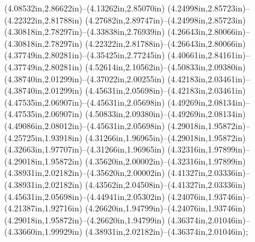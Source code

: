 (4.08532in,2.86622in)--(4.13262in,2.85070in) (4.24998in,2.85723in)--(4.22322in,2.81788in) (4.27682in,2.89747in)--(4.24998in,2.85723in) (4.30818in,2.78297in)--(4.33838in,2.76939in) (4.26643in,2.80066in)--(4.30818in,2.78297in) (4.22322in,2.81788in)--(4.26643in,2.80066in) (4.37749in,2.80281in)--(4.35425in,2.77245in) (4.40661in,2.84161in)--(4.37749in,2.80281in) (4.52614in,2.10562in)--(4.50833in,2.09380in) (4.38740in,2.01299in)--(4.37022in,2.00255in) (4.42183in,2.03461in)--(4.38740in,2.01299in) (4.45631in,2.05698in)--(4.42183in,2.03461in) (4.47535in,2.06907in)--(4.45631in,2.05698in) (4.49269in,2.08134in)--(4.47535in,2.06907in) (4.50833in,2.09380in)--(4.49269in,2.08134in) (4.49086in,2.08012in)--(4.45631in,2.05698in) (4.29018in,1.95872in)--(4.25725in,1.93918in) (4.31266in,1.96965in)--(4.29018in,1.95872in) (4.32663in,1.97707in)--(4.31266in,1.96965in) (4.32316in,1.97899in)--(4.29018in,1.95872in) (4.35620in,2.00002in)--(4.32316in,1.97899in) (4.38931in,2.02182in)--(4.35620in,2.00002in) (4.41327in,2.03336in)--(4.38931in,2.02182in) (4.43562in,2.04508in)--(4.41327in,2.03336in) (4.45631in,2.05698in)--(4.44941in,2.05302in) (4.24076in,1.93746in)--(4.21387in,1.92716in) (4.26620in,1.94799in)--(4.24076in,1.93746in) (4.29018in,1.95872in)--(4.26620in,1.94799in) (4.36374in,2.01046in)--(4.33660in,1.99929in) (4.38931in,2.02182in)--(4.36374in,2.01046in);
